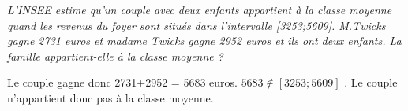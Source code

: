 
\textit{L'INSEE estime qu'un couple avec deux enfants appartient à la classe moyenne quand les revenus du foyer sont situés dans l'intervalle [3253;5609]. M.Twicks gagne 2731 euros et madame Twicks gagne 2952 euros et ils ont deux enfants. La famille appartient-elle à la classe moyenne ?}

Le couple gagne donc 2731+2952 = 5683 euros. $5683 \not \in [3253;5609]$ . Le couple n'appartient donc pas à la classe moyenne.
